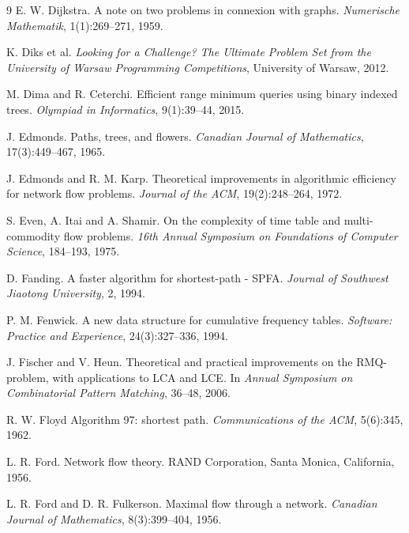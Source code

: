 \begin{thebibliography}{9}
  E. W. Dijkstra.
  A note on two problems in connexion with graphs.
  \emph{Numerische Mathematik}, 1(1):269--271, 1959.

  K. Diks et al.
  \emph{Looking for a Challenge? The Ultimate Problem Set from
  the University of Warsaw Programming Competitions}, University of Warsaw, 2012.



  M. Dima and R. Ceterchi.
  Efficient range minimum queries using binary indexed trees.
  \emph{Olympiad in Informatics}, 9(1):39--44, 2015.

  J. Edmonds.
  Paths, trees, and flowers.
  \emph{Canadian Journal of Mathematics}, 17(3):449--467, 1965.

  J. Edmonds and R. M. Karp.
  Theoretical improvements in algorithmic efficiency for network flow problems.
  \emph{Journal of the ACM}, 19(2):248--264, 1972.

  S. Even, A. Itai and A. Shamir.
  On the complexity of time table and multi-commodity flow problems.
  \emph{16th Annual Symposium on Foundations of Computer Science}, 184--193, 1975.

  D. Fanding.
  A faster algorithm for shortest-path - SPFA.
  \emph{Journal of Southwest Jiaotong University}, 2, 1994.

  P. M. Fenwick.
  A new data structure for cumulative frequency tables.
  \emph{Software: Practice and Experience}, 24(3):327--336, 1994.

  J. Fischer and V. Heun.
  Theoretical and practical improvements on the RMQ-problem, with applications to LCA and LCE.
  In \emph{Annual Symposium on Combinatorial Pattern Matching}, 36--48, 2006.

  R. W. Floyd
  Algorithm 97: shortest path.
  \emph{Communications of the ACM}, 5(6):345, 1962.

  L. R. Ford.
  Network flow theory.
  RAND Corporation, Santa Monica, California, 1956.

  L. R. Ford and D. R. Fulkerson.
  Maximal flow through a network.
  \emph{Canadian Journal of Mathematics}, 8(3):399--404, 1956.


\end{thebibliography}
